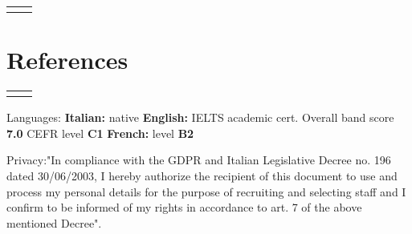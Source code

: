 \documentclass[
	10pt, %
]{../templates/FreemanCV}
\begin{document}
\begin{paracol}{2}
\begin{supertabular}{r l}

\end{supertabular}


\section{References}




\begin{supertabular}{r l} %
	
	
\end{supertabular}

\end{paracol} %

\textcolor{headings}{Languages:} \qquad \textbf{Italian:}  native \qquad
                                \textbf{English:}  IELTS academic cert. Overall band score \textbf{7.0} CEFR level \textbf{C1}\qquad
                                \textbf{French:} level \textbf{B2} 
\smallskip

\textcolor{headings}{Privacy:}\quad"In compliance with the GDPR and Italian Legislative Decree no. 196 dated 30/06/2003, I hereby authorize the recipient of this document to use and process my personal details for the purpose of recruiting and selecting staff and I confirm to be informed of my rights in accordance to art. 7 of the above mentioned Decree".
\end{document}
